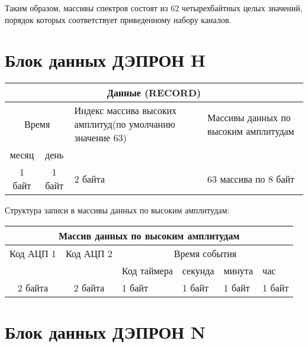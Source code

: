 Таким образом, массивы спектров состоят из 62 четырехбайтных целых значений, порядок которых соответствует приведенному набору каналов.

\section{Блок данных ДЭПРОН H}


\small
\begin{center}
	\begin{tabularx}{\textwidth}{|c|c|X|X|}
		\hline
		\multicolumn{4}{|c|}{Данные (RECORD)}                                                                                          \\ \hline
		\multicolumn{2}{|c|}{Время} & Индекс массива высоких амплитуд(по умолчанию значение 63) & Массивы данных по высоким амплитудам \\ \cline{1-2}
		месяц  &        день        &                                                           &  \\ \hline
		1 байт &       1 байт       & 2 байта                                                   & 63 массива  по 8 байт                \\ \hline
	\end{tabularx}  
\end{center}
\normalsize
	



Структура записи в массивы данных по высоким амплитудам:

\small
\begin{center}
	\begin{tabularx}{\textwidth}{|c|c|X|X|X|X|}
		\hline
		\multicolumn{6}{|c|}{Массив данных по высоким амплитудам}       \\ \hline
		Код АЦП 1 & Код АЦП 2 &   \multicolumn{4}{c|}{Время события}    \\ \cline{3-6}
		          &           & Код таймера & секунда & минута & час    \\ \hline
		 2 байта  &  2 байта  & 1 байт      & 1 байт  & 1 байт & 1 байт \\ \hline
	\end{tabularx}  
\end{center}
\normalsize




\section{Блок данных ДЭПРОН N}

